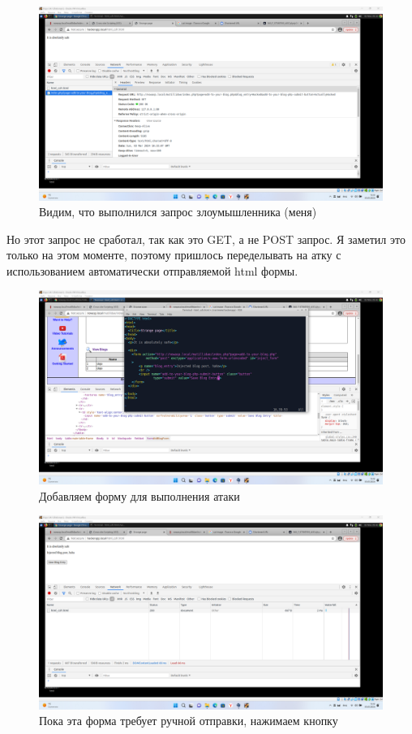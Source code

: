 \documentclass[a4paper]{article}
\begin{document}
  \begin{figure}[H]
    \centering
    \includegraphics[width=\textwidth]{Screenshot_43}
    \caption{Видим, что выполнился запрос злоумышленника (меня)}
  \end{figure}

  Но этот запрос не сработал, так как это GET, а не POST запрос. Я заметил это только на этом моменте, поэтому пришлось
  переделывать на атку с использованием автоматически отправляемой html формы.

  \begin{figure}[H]
    \centering
    \includegraphics[width=\textwidth]{Screenshot_44}
    \caption{Добавляем форму для выполнения атаки}
  \end{figure}

  \begin{figure}[H]
    \centering
    \includegraphics[width=\textwidth]{Screenshot_46}
    \caption{Пока эта форма требует ручной отправки, нажимаем кнопку}
  \end{figure}
\end{document}
